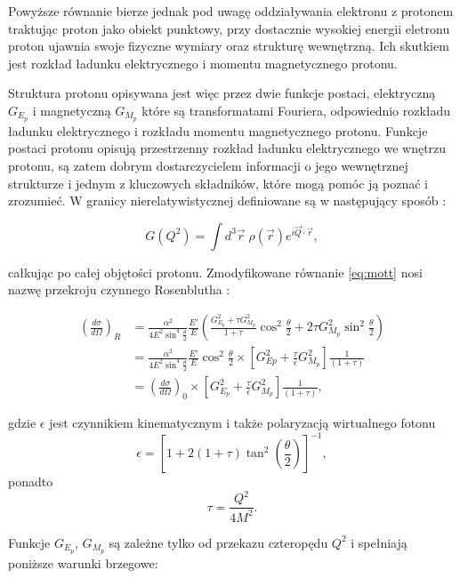 \documentclass[11pt]{book}
\theoremstyle{definition}
\begin{document}
Powyższe równanie bierze jednak pod uwagę oddziaływania elektronu z protonem traktując proton jako obiekt punktowy, przy dostacznie wysokiej energii eletronu proton ujawnia swoje fizyczne wymiary oraz strukturę wewnętrzną. Ich skutkiem jest rozkład ładunku elektrycznego i momentu magnetycznego protonu. 


Struktura protonu opisywana jest więc przez dwie funkcje postaci, elektryczną $G_{E_p}$ i magnetyczną $G_{M_p}$ które są transformatami Fouriera, odpowiednio rozkładu ładunku elektrycznego i rozkładu momentu magnetycznego protonu.  Funkcje postaci protonu opisują przestrzenny rozkład ładunku elektrycznego we wnętrzu protonu, są zatem dobrym dostarczycielem informacji o jego wewnętrznej strukturze i jednym z kluczowych składników, które mogą pomóc ją poznać i zrozumieć. W granicy nierelatywistycznej definiowane są w następujący sposób \cite{Carlson:2015jba}:

\begin{equation}
G(Q^2) = \int d^3 \vec{r} \; \rho(\vec{r}) e^{i\vec{Q}\cdot \vec{r}} , \label{eq:formfactor}
\end{equation}

całkując po całej objętości protonu. Zmodyfikowane równanie \ref{eq:mott} nosi nazwę przekroju czynnego Rosenblutha \cite{1990..Taylor}:

\begin{equation}
\begin{split}
\left( \frac{d\sigma}{d\Omega} \right)_R  &= \frac{\alpha^2 }{4E^2\sin^4 \frac{\theta}{2}} \frac{E'}{E} \left(\frac{G_{E_p}^2 + \tau G_{M_p}^2}{1+\tau} \cos^2 \frac{\theta}{2} + 2\tau G_{M_p}^2\sin^2\frac{\theta}{2}\right) \\
&=  \frac{\alpha^2 }{4E^2\sin^4 \frac{\theta}{2}} \frac{E'}{E}  \cos^2 \frac{\theta}{2} \times \left[ G_{Ep}^2 + \frac{\tau}{\epsilon} G_{M_p}^2 \right] \frac{1}{\left(1 + \tau\right)} \\
&= \left( \frac{d\sigma}{d\Omega} \right)_0 \times \left[ G_{E_p}^2 + \frac{\tau}{\epsilon} G_{M_p}^2 \right] \frac{1}{\left(1 + \tau\right)},
\end{split}
\end{equation}

gdzie $\epsilon$ jest czynnikiem kinematycznym i także polaryzacją wirtualnego fotonu
$$\epsilon = \left[ 1 + 2(1 + \tau) \tan^2 \left(\frac{\theta}{2}\right) \right]^{-1},$$
ponadto $$\tau = \frac{Q^2}{4M^2}.$$

Funkcje $G_{E_p}$, $ G_{M_p}$ są zależne tylko od przekazu czteropędu $Q^2$ i spełniają poniższe warunki brzegowe:
\end{document}
